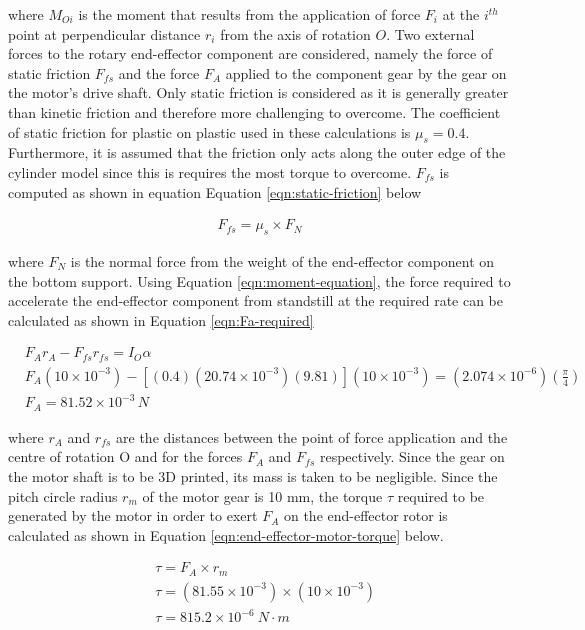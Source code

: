 where $M_{Oi}$ is the moment that results from the application of force $F_i$ at the $i^{th}$ point at perpendicular distance $r_i$ from the axis of rotation $O$. Two external forces to the rotary end-effector component are considered, namely the force of static friction $F_{fs}$ and the force $F_A$ applied to the component gear by the gear on the motor's drive shaft. Only static friction is considered as it is generally greater than kinetic friction and therefore more challenging to overcome. The coefficient of static friction for plastic on plastic used in these calculations is $\mu _s = 0.4$. Furthermore, it is assumed that the friction only acts along the outer edge of the cylinder model since this is requires the most torque to overcome. $F_{fs}$ is computed as shown in equation Equation \ref{eqn:static-friction} below

\begin{align}
	F_{fs}=\mu _s \times F_N
	\label{eqn:static-friction}
\end{align}

where $F_N$ is the normal force from the weight of the end-effector component on the bottom support. Using Equation \ref{eqn:moment-equation}, the force required to accelerate the end-effector component from standstill at the required rate can be calculated as shown in Equation \ref{eqn:Fa-required}

\begin{align}
	&F_A r_A - F_{fs} r_{fs} = I_O \alpha
	\label{eqn:Fa-required} \\
	&F_A (10 \times 10^{-3}) - [(0.4)(20.74 \times 10^{-3})(9.81)] (10 \times 10^{-3}) = (2.074 \times 10^{-6})\left(\frac{\pi}{4}\right) \\
	&F_A = 81.52 \times 10^{-3} \, N
\end{align}

where $r_A$ and $r_{fs}$ are the distances between the point of force application and the centre of rotation O and for the forces $F_A$ and $F_{fs}$ respectively. Since the gear on the motor shaft is to be 3D printed, its mass is taken to be negligible. Since the pitch circle radius $r_m$ of the motor gear is 10 mm, the torque $\tau$ required to be generated by the motor in order to exert $F_A$ on the end-effector rotor is calculated as shown in Equation \ref{eqn:end-effector-motor-torque} below.

\begin{align}
	& \tau = F_A \times r_m
	\label{eqn:end-effector-motor-torque} \\
	& \tau = (81.55 \times 10^{-3}) \times (10 \times 10^{-3}) \\
	& \tau = 815.2 \times 10^{-6} \: N \cdot m
\end{align}

